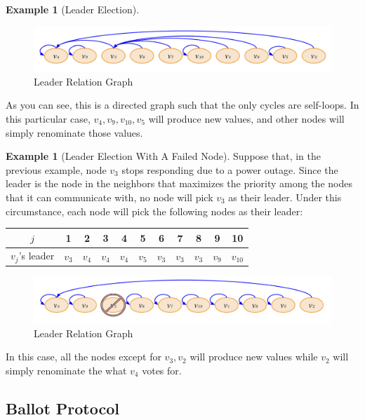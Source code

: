 \documentclass[12pt, psamsfonts]{amsart}
\theoremstyle{definition}
\newtheorem{exmp}[thm]{Example}
\theoremstyle{remark}
\numberwithin{equation}{subsection}
\begin{document}
\begin{exmp}[Leader Election]
    \begin{figure}[!htb]
        \includegraphics[width=.8\linewidth]{img/leader_election.jpeg}
        \caption{Leader Relation Graph}
        \label{fig:leader_relation}
    \end{figure}

    As you can see, this is a directed graph such that the only cycles are self-loops.
    In this particular case, $v_4, v_9, v_{10}, v_5$ will produce new values, and other nodes will simply renominate those values.
\end{exmp}

\begin{exmp}[Leader Election With A Failed Node]
    Suppose that, in the previous example, node $v_3$ stops responding due to a power outage.
    Since the leader is the node in the neighbors that maximizes the priority among the nodes that it can communicate with, no node will pick $v_3$ as their leader.
    Under this circumstance, each node will pick the following nodes as their leader:

    \begin{center}
      \begin{tabular}{ | c | c | c | c | c | c | c | c | c | c | c | }
        \hline
            $j$ & 1 & 2 & 3 & 4 & 5 & 6 & 7 & 8 & 9 & 10 \\ \hline
            $v_j$'s leader & $v_3$ & $v_4$ & $v_4$ & $v_4$ & $v_5$ & $v_3$ & $v_3$ & $v_3$ & $v_9$ & $v_{10}$ \\
        \hline
      \end{tabular}
    \end{center}

    \begin{figure}[!htb]
        \includegraphics[width=.8\linewidth]{img/leader_election_with_failed_node.jpeg}
        \caption{Leader Relation Graph}
        \label{fig:leader_relation}
    \end{figure}
    
    In this case, all the nodes except for $v_3, v_2$ will produce new values while $v_2$ will simply renominate the what $v_4$ votes for.
\end{exmp}

\newpage
\subsection{Ballot Protocol}
\end{document}
